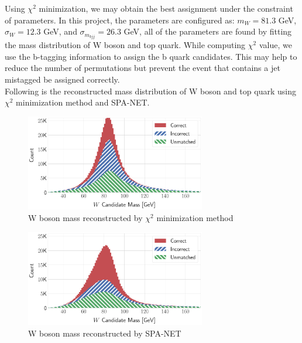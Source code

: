 Using $\chi^{2}$ minimization, we may obtain the best assignment under the constraint of parameters. In this project, the parameters are configured as: $m_{W}=81.3$ GeV, $\sigma_{W} = 12.3$ GeV, and $\sigma_{m_{bjj}}=26.3$ GeV, all of the parameters are found by fitting the mass distribution of W boson and top quark. While computing $\chi^{2}$ value, we use the b-tagging information to assign the b quark candidates. This may help to reduce the number of permutations but prevent the event that contains a jet mistagged be assigned correctly.
\\
Following is the reconstructed mass distribution of W boson and top quark using $\chi^{2}$ minimization method and SPA-NET.
\\
\begin{figure}[H]
	\centering
	\includegraphics[width=0.7\textwidth]{Figures/network_w_quark_stacked_chi2.pdf}
	\caption{W boson mass reconstructed by $\chi^{2}$ minimization method}
	\label{fig: chi2 reco Wboson}
\end{figure}
\begin{figure}[H]
	\centering
	\includegraphics[width=0.7\textwidth]{Figures/network_w_quark_stacked.pdf}
	\caption{W boson mass reconstructed by SPA-NET}
	\label{fig: spanet reco Wboson}
\end{figure}

